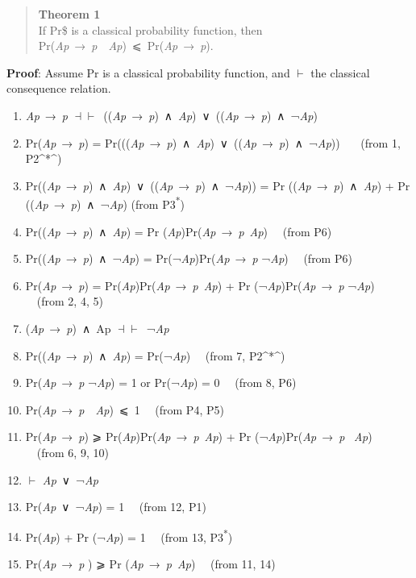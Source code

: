 \documentclass[
  10pt,
  letterpaper,
  DIV=11,
  numbers=noendperiod,
  twoside]{scrartcl}
\providecommand{\tightlist}{%
  \setlength{\itemsep}{0pt}\setlength{\parskip}{0pt}}\usepackage{longtable,booktabs,array}
\begin{document}
\begin{quote}
\textbf{Theorem 1}\\
If Pr\$ is a classical probability function, then\\
Pr(\emph{Ap}~→~\emph{p}~\textbar~\emph{Ap})~⩽~Pr(\emph{Ap}~→~\emph{p}).
\end{quote}

\textbf{Proof}: Assume Pr is a classical probability function, and
\(\vdash\) the classical consequence relation.

\begin{enumerate}
\def\labelenumi{\arabic{enumi}.}
\tightlist
\item
  \emph{Ap}~→~\emph{p}
  \(\dashv \vdash\)~((\emph{Ap}~→~\emph{p})~∧~\emph{Ap})~∨~((\emph{Ap}~→~\emph{p})~∧~¬\emph{Ap})
\item
  Pr(\emph{Ap}~→~\emph{p}) =
  Pr(((\emph{Ap}~→~\emph{p})~∧~\emph{Ap})~∨~((\emph{Ap}~→~\emph{p})~∧~¬\emph{Ap}))
  ~~~(from 1, P2\^{}*\^{})
\item
  Pr((\emph{Ap}~→~\emph{p})~∧~\emph{Ap})~∨~((\emph{Ap}~→~\emph{p})~∧~¬\emph{Ap}))
  = Pr ((\emph{Ap}~→~\emph{p})~∧~\emph{Ap}) + Pr
  ((\emph{Ap}~→~\emph{p})~∧~¬\emph{Ap}) (from P3\textsuperscript{*})
\item
  Pr((\emph{Ap}~→~\emph{p})~∧~\emph{Ap}) = Pr
  (\emph{Ap})Pr(\emph{Ap}~→~\emph{p}\textbar~\emph{Ap}) ~~(from P6)
\item
  Pr((\emph{Ap}~→~\emph{p})~∧~¬\emph{Ap}) =
  Pr(¬\emph{Ap})Pr(\emph{Ap}~→~\emph{p} \textbar¬\emph{Ap}) ~~(from P6)
\item
  Pr(\emph{Ap}~→~\emph{p}) =
  Pr(\emph{Ap})Pr(\emph{Ap}~→~\emph{p}\textbar~\emph{Ap}) + Pr
  (¬\emph{Ap})Pr(\emph{Ap}~→~\emph{p} \textbar¬\emph{Ap}) ~~(from 2, 4,
  5)
\item
  (\emph{Ap}~→~\emph{p})~∧~Ap \(\dashv \vdash\)~¬\emph{Ap}
\item
  Pr((\emph{Ap}~→~\emph{p})~∧~\emph{Ap}) = Pr(¬\emph{Ap}) ~~(from 7,
  P2\^{}*\^{})
\item
  Pr(\emph{Ap}~→~\emph{p} \textbar¬\emph{Ap}) = 1 or Pr(¬\emph{Ap}) = 0
  ~~(from 8, P6)
\item
  Pr(\emph{Ap}~→~\emph{p}~\textbar~\emph{Ap})~⩽~1 ~~(from P4, P5)
\item
  Pr(\emph{Ap}~→~\emph{p}) ⩾
  Pr(\emph{Ap})Pr(\emph{Ap}~→~\emph{p}\textbar~\emph{Ap}) + Pr
  (¬\emph{Ap})Pr(\emph{Ap}~→~\emph{p} \textbar~\emph{Ap}) ~~(from 6, 9,
  10)
\item
  \(\vdash\) \emph{Ap}~∨~¬\emph{Ap} ~~
\item
  Pr(\emph{Ap}~∨~¬\emph{Ap}) = 1 ~~(from 12, P1)
\item
  Pr(\emph{Ap}) + Pr (¬\emph{Ap}) = 1 ~~(from 13, P3\textsuperscript{*})
\item
  Pr(\emph{Ap}~→~\emph{p} ) ⩾ Pr
  (\emph{Ap}~→~\emph{p}\textbar~\emph{Ap}) ~~(from 11, 14)
\end{enumerate}
\end{document}
